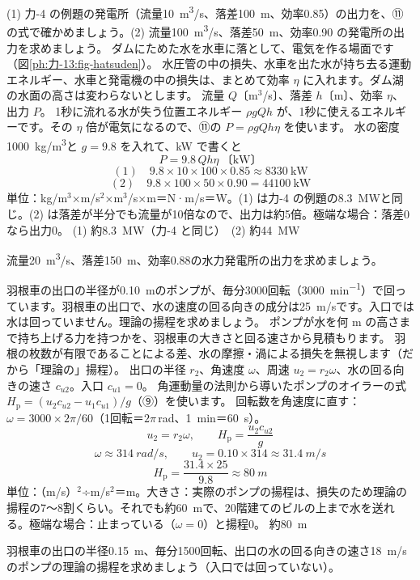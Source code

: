 \begin{phreidai}[水力発電所の出力]
\label{ph:力-13:ex12}(1) 力-4 の例題の発電所（流量\qty{10}{m^3/s}、落差\qty{100}{m}、効率0.85）の出力を、⑪の式で確かめましょう。(2) 流量\qty{100}{m^3/s}、落差\qty{50}{m}、効率0.90 の発電所の出力を求めましょう。
\phbamen
ダムにためた水を水車に落として、電気を作る場面です（図\ref{ph:力-13:fig-hatsuden}）。
\phmushi
水圧管の中の損失、水車を出た水が持ち去る運動エネルギー、水車と発電機の中の損失は、まとめて効率 $\eta$ に入れます。ダム湖の水面の高さは変わらないとします。
\phzu
流量 $Q$〔m$^3$/s〕、落差 $h$〔m〕、効率 $\eta$、出力 $P$。
\phriyu
1秒に流れる水が失う位置エネルギー $\rho gQh$ が、1秒に使えるエネルギーです。その $\eta$ 倍が電気になるので、⑪の $P=\rho gQh\eta$ を使います。
\phtateru
水の密度\qty{1000}{kg/m^3}と $g=9.8$ を入れて、kW で書くと
\[ P=9.8\,Qh\eta\ \text{〔kW〕} \]
\phtoku
\[ (1)\quad 9.8\times10\times100\times0.85\approx\num{8330}\ \text{kW} \]
\[ (2)\quad 9.8\times100\times50\times0.90=\num{44100}\ \text{kW} \]
\phtashikame
単位：kg/m$^3$×m/s$^2$×m$^3$/s×m＝N·m/s＝W。(1) は力-4 の例題の\qty{8.3}{MW}と同じ。(2) は落差が半分でも流量が10倍なので、出力は約5倍。極端な場合：落差0なら出力0。
\kotae (1) 約\qty{8.3}{MW}（力-4 と同じ）　(2) 約\qty{44}{MW}
\end{phreidai}
\begin{jibun}
流量\qty{20}{m^3/s}、落差\qty{150}{m}、効率0.88の水力発電所の出力を求めましょう。
\end{jibun}

\begin{phreidai}[ポンプの理論の揚程]
\label{ph:力-13:ex13}羽根車の出口の半径が\qty{0.10}{m}のポンプが、毎分3000回転（\qty{3000}{min^{-1}}）で回っています。羽根車の出口で、水の速度の回る向きの成分は\qty{25}{m/s}です。入口では水は回っていません。理論の揚程を求めましょう。
\phbamen
ポンプが水を何 m の高さまで持ち上げる力を持つかを、羽根車の大きさと回る速さから見積もります。
\phmushi
羽根の枚数が有限であることによる差、水の摩擦・渦による損失を無視します（だから「理論の」揚程）。
\phzu
出口の半径 $r_2$、角速度 $\omega$、周速 $u_2=r_2\omega$、水の回る向きの速さ $c_{u2}$。入口 $c_{u1}=0$。
\phriyu
角運動量の法則から導いたポンプのオイラーの式 $H_{\mathrm p}=(u_2c_{u2}-u_1c_{u1})/g$（⑨）を使います。
\phtateru
回転数を角速度に直す：$\omega=3000\times 2\pi/60$（1回転＝$2\pi$\,rad、\qty{1}{min}＝\qty{60}{s}）。
\[ u_2=r_2\omega,\qquad H_{\mathrm p}=\frac{u_2c_{u2}}{g} \]
\phtoku
\[ \omega\approx\qty{314}{rad/s},\qquad u_2=0.10\times314\approx\qty{31.4}{m/s} \]
\[ H_{\mathrm p}=\frac{31.4\times25}{9.8}\approx\qty{80}{m} \]
\phtashikame
単位：（m/s）$^2$÷m/s$^2$＝m。大きさ：実際のポンプの揚程は、損失のため理論の揚程の7〜8割くらい。それでも約\qty{60}{m}で、20階建てのビルの上まで水を送れる。極端な場合：止まっている（$\omega=0$）と揚程0。
\kotae 約\qty{80}{m}
\end{phreidai}
\begin{jibun}
羽根車の出口の半径\qty{0.15}{m}、毎分1500回転、出口の水の回る向きの速さ\qty{18}{m/s}のポンプの理論の揚程を求めましょう（入口では回っていない）。
\end{jibun}

